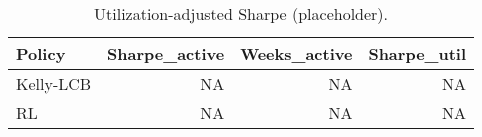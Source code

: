 \begin{table}

\caption{\label{tab:unnamed-chunk-1}Utilization-adjusted Sharpe (placeholder).}
\centering
\begin{tabular}[t]{lrrr}
\toprule
Policy & Sharpe\_active & Weeks\_active & Sharpe\_util\\
\midrule
Kelly-LCB & NA & NA & NA\\
RL & NA & NA & NA\\
\bottomrule
\end{tabular}
\end{table}
